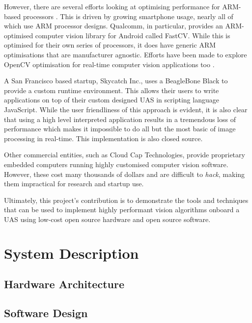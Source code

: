 \documentclass{acm_proc_article-sp}
\begin{document}
However, there are several efforts looking at optimising performance for ARM-based processors \cite{mitra2013use}. This is driven by growing smartphone usage, nearly all of which use ARM processor designs. Qualcomm, in particular, provides an ARM-optimised computer vision library for Android called FastCV. While this is optimised for their own series of processors, it does have generic ARM optimisations that are manufacturer agnostic. Efforts have been made to explore OpenCV optimisation for real-time computer vision applications too \cite{pulli2012real}.

A San Francisco based startup, Skycatch Inc., uses a BeagleBone Black to provide a custom runtime environment. This allows their users to write applications on top of their custom designed UAS in scripting language JavaScript. While the user friendliness of this approach is evident, it is also clear that using a high level interpreted application results in a tremendous loss of performance which makes it impossible to do all but the most basic of image processing in real-time. This implementation is also closed source. 

Other commercial entities, such as Cloud Cap Technologies, provide proprietary embedded computers running highly customised computer vision software. However, these cost many thousands of dollars and are difficult to \textit{hack}, making them impractical for research and startup use.

Ultimately, this project's contribution is to demonstrate the tools and techniques that can be used to implement highly performant vision algorithms onboard a UAS using low-cost open source hardware and open source software.

\section{System Description\label{sec:system-description}}

\subsection{Hardware Architecture}

\subsection{Software Design}
\end{document}

